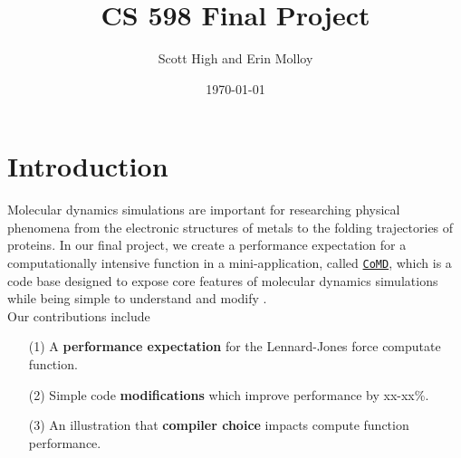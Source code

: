 \documentclass[12pt]{article}
\title{CS 598 Final Project}
\author{Scott High and Erin Molloy}
\date{\today}
\begin{document}
\maketitle

\section{Introduction}
Molecular dynamics simulations are important for researching physical phenomena 
from the electronic structures of metals to the folding trajectories of proteins. 
In our final project, we create a performance expectation for a computationally
intensive function in a mini-application, called \href{https://github.com/exmatex/CoMD}{\texttt{CoMD}}, 
which is a code base designed to expose core features of molecular dynamics simulations
while being simple to understand and modify \cite{CoMD}. \\
\noindent Our contributions include
\begin{itemize}
    \item [(1)] A {\bf performance expectation} for the Lennard-Jones force computate function.
    \item [(2)] Simple code {\bf modifications} which improve performance by xx-xx\%.
    \item [(3)] An illustration that {\bf compiler choice} impacts compute function performance.
\end{itemize}
\end{document}
